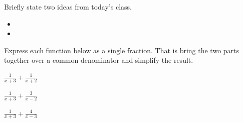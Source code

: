 \postClass

\begin{problem}
\item Briefly state two ideas from today's class.
  \begin{itemize}
  \item
  \item
  \end{itemize}
\item
  \begin{subproblem}
    \item
  \end{subproblem}
\end{problem}



\begin{problem}
\item Express each function below as a single fraction. That is bring
  the two parts together over a common denominator and simplify the
  result.
  \begin{subproblem}
  \item $\frac{1}{x+3} + \frac{1}{x+2}$
    \vfill
  \item $\frac{1}{x+3} + \frac{3}{x-2}$
    \vfill
  \item $\frac{1}{x+3} + \frac{4}{x-3}$
    \vfill
  \end{subproblem}
\end{problem}


